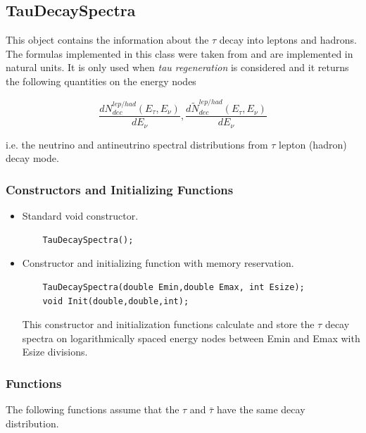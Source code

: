 \documentclass[3p,12pt,authoryear]{elsarticle}
\begin{document}
\subsection{TauDecaySpectra}

This object contains the information about the $\tau$ decay into leptons and hadrons. The formulas implemented in this class were taken from \citep{Dutta:2000jv} and are implemented in natural units. It is only used when {\it tau regeneration} is considered and it returns the following quantities on the energy nodes

\begin{equation}
\frac{dN^{lep/had}_{dec} (E_\tau, E_\nu)}{dE_\nu} , \frac{d\tilde{N}^{lep/had}_{dec} (E_\tau, E_\nu)}{dE_\nu} 
\label{eqn:tau-dist}
\end{equation}

i.e. the neutrino and antineutrino spectral distributions from $\tau$ lepton (hadron) decay mode.

\subsubsection{Constructors and Initializing Functions}

\begin{itemize}
\item Standard void constructor.
  \begin{lstlisting}
    TauDecaySpectra();
  \end{lstlisting}
\item Constructor and initializing function with memory reservation.
  \begin{lstlisting}
    TauDecaySpectra(double Emin,double Emax, int Esize);
    void Init(double,double,int);
  \end{lstlisting}
This constructor and initialization functions calculate and store the $\tau$ decay spectra on logarithmically spaced energy nodes between {\ttfamily Emin} and {\ttfamily Emax} with {\ttfamily Esize} divisions.
\end{itemize}

\subsubsection{Functions}

The following functions assume that the $\tau$ and $\bar{\tau}$ have the same decay distribution.
\end{document}
